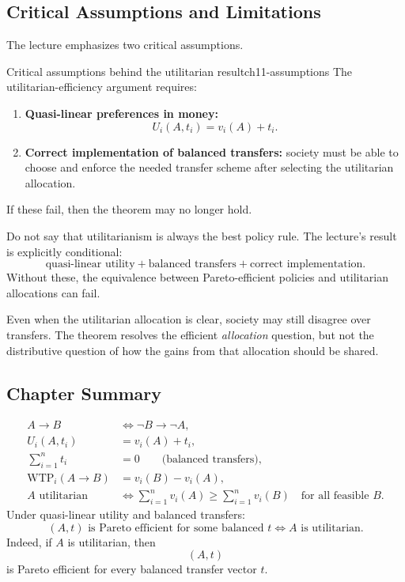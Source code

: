 \subsection{Critical Assumptions and Limitations}

The lecture emphasizes two critical assumptions.

\begin{definition}{Critical assumptions behind the utilitarian result}{ch11-assumptions}
The utilitarian-efficiency argument requires:
\begin{enumerate}
    \item \textbf{Quasi-linear preferences in money:}
    \[
    U_i(A,t_i)=v_i(A)+t_i.
    \]
    \item \textbf{Correct implementation of balanced transfers:} society must be able to choose and enforce the needed transfer scheme after selecting the utilitarian allocation.
\end{enumerate}
\end{definition}

If these fail, then the theorem may no longer hold.

\begin{commonmistake}
Do not say that utilitarianism is always the best policy rule. The lecture's result is explicitly conditional:
\[
\text{quasi-linear utility} + \text{balanced transfers} + \text{correct implementation}.
\]
Without these, the equivalence between Pareto-efficient policies and utilitarian allocations can fail.
\end{commonmistake}

\begin{policynote}
Even when the utilitarian allocation is clear, society may still disagree over transfers. The theorem resolves the efficient \emph{allocation} question, but not the distributive question of how the gains from that allocation should be shared.
\end{policynote}

\subsection{Chapter Summary}

\begin{keyformula}[title={Key Formula: Lecture 11 Summary}]
\begin{align*}
A \to B &\Longleftrightarrow \neg B \to \neg A, \\
U_i(A,t_i) &= v_i(A)+t_i, \\
\sum_{i=1}^n t_i &= 0 \qquad \text{(balanced transfers)}, \\
\text{WTP}_i(A \to B) &= v_i(B)-v_i(A), \\
A \text{ utilitarian}
&\iff
\sum_{i=1}^n v_i(A) \ge \sum_{i=1}^n v_i(B)
\quad \text{for all feasible } B.
\end{align*}
Under quasi-linear utility and balanced transfers:
\[
(A,t) \text{ is Pareto efficient for some balanced } t
\iff
A \text{ is utilitarian.}
\]
Indeed, if $A$ is utilitarian, then
\[
(A,t)
\]
is Pareto efficient for every balanced transfer vector $t$.
\end{keyformula}

